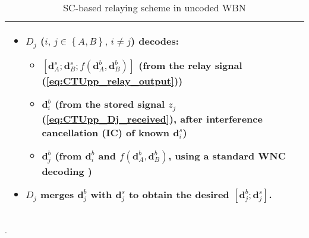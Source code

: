 \begin{table}
\begin{tabular}{|>{\raggedright}p{}|}
\begin{itemize}
\item $D_{j}$ ($i,\,j\in\left\{ A,B\right\} ,\,i\neq j$) decodes:

\begin{itemize}
\item $\left[\mathbf{d}_{A}^{s};\mathbf{d}_{B}^{s};f(\mathbf{d}_{A}^{b},\mathbf{d}_{B}^{b})\right]$
(from the relay signal (\ref{eq:CTUpp_relay_output}))
\item $\mathbf{d}_{i}^{b}$ (from the stored signal $z_{j}$ (\ref{eq:CTUpp_Dj_received}),
after interference cancellation (IC) of known $\mathbf{d}_{i}^{s}$)
\item $\mathbf{d}_{j}^{b}$ (from $\mathbf{d}_{i}^{b}$ and $f(\mathbf{d}_{A}^{b},\mathbf{d}_{B}^{b})$,
using a standard WNC decoding \cite{Sykora-Burr_2011-TVT})
\end{itemize}
\item $D_{j}$ merges $\mathbf{d}_{j}^{b}$ with $\mathbf{d}_{j}^{s}$ to
obtain the desired $\left[\mathbf{d}_{j}^{b};\mathbf{d}_{j}^{s}\right]$.\end{itemize}
\tabularnewline
\hline 
\end{tabular}\caption{SC-based relaying scheme in uncoded WBN}.\label{tab:CTUpp_SC-relaying-scheme}
\end{table}


